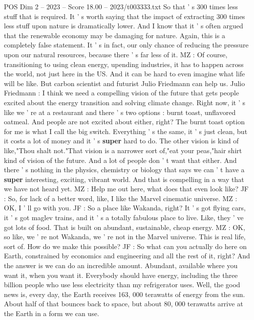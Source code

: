 \begin{textsample}{POS Dim 2 – 2023 – Score 18.00 – 2023/t003333.txt}
So that ' s 300 times less stuff that is required.
It ' s worth saying that the impact of extracting 300 times less stuff upon nature is dramatically lower.
And I know that it ' s often argued that the renewable economy may be damaging for nature.
Again, this is a completely false statement.
It ' s in fact, our only chance of reducing the pressure upon our natural resources, because there ' s far less of it.
MZ : Of course, transitioning to using clean energy, upending industries, it has to happen across the world, not just here in the US.
And it can be hard to even imagine what life will be like.
But carbon scientist and futurist Julio Friedmann can help us.
Julio Friedmann : I think we need a compelling vision of the future that gets people excited about the energy transition and solving climate change.
Right now, it ' s like we ' re at a restaurant and there ' s two options : burnt toast, unflavored oatmeal.
And people are not excited about either, right?
The burnt toast option for me is what I call the big switch.
Everything ' s the same, it ' s just clean, but it costs a lot of money and it ' s \textbf{super} hard to do.
The other vision is kind of like,"Thou shalt not."That vision is a narrower sort of,"eat your peas,"hair shirt kind of vision of the future.
And a lot of people don ' t want that either.
And there ' s nothing in the physics, chemistry or biology that says we can ' t have a \textbf{super} interesting, exciting, vibrant world.
And that is compelling in a way that we have not heard yet.
MZ : Help me out here, what does that even look like?
JF : So, for lack of a better word, like, I like the Marvel cinematic universe.
MZ : OK, I ' ll go with you.
JF : So a place like Wakanda, right?
It ' s got flying cars, it ' s got maglev trains, and it ' s a totally fabulous place to live.
Like, they ' ve got lots of food.
That is built on abundant, sustainable, cheap energy.
MZ : OK, so like, we ' re not Wakanda, we ' re not in the Marvel universe.
This is real life, sort of.
How do we make this possible?
JF : So what can you actually do here on Earth, constrained by economics and engineering and all the rest of it, right?
And the answer is we can do an incredible amount.
Abundant, available where you want it, when you want it.
Everybody should have energy, including the three billion people who use less electricity than my refrigerator uses.
Well, the good news is, every day, the Earth receives 163, 000 terawatts of energy from the sun.
About half of that bounces back to space, but about 80, 000 terawatts arrive at the Earth in a form we can use.

\end{textsample}
